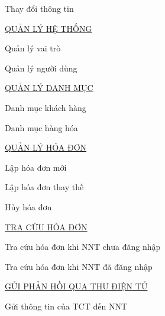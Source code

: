 Thay đổi thông tin

\underline{\textsc{QUẢN LÝ HỆ THỐNG}}

Quản lý vai trò

Quản lý người dùng

\underline{\textsc{QUẢN LÝ DANH MỤC}}

Danh mục khách hàng

Danh mục hàng hóa

\underline{\textsc{QUẢN LÝ HÓA ĐƠN}}

Lập hóa đơn mới

Lập hóa đơn thay thế

Hủy hóa đơn

\underline{\textsc{TRA CỨU HÓA ĐƠN}}

Tra cứu hóa đơn khi NNT chưa đăng nhập

Tra cứu hóa đơn khi NNT đã đăng nhập

\underline{\textsc{GỬI PHẢN HỒI QUA THƯ ĐIỆN TỬ}}

Gửi thông tin của TCT đến NNT